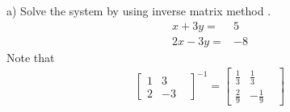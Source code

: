 \documentclass{exam}
\begin{document}
\begin{questions}
	
	\question 	\subitem a) Solve the system by using inverse matrix method .\hfill\enspace\hrulefill
	\begin{align}
	\nonumber
	x+3y=&5 \\ 
	\nonumber
	2x-3y=&-8   
	\end{align}
	Note that 
		\begin{align}
		\nonumber
		\begin{bmatrix}
		1 &   3&  \\
		2 &   -3&  
		\end{bmatrix}^{-1}=
		\begin{bmatrix}
		\frac{1}{3} &   \frac{1}{3}&  \\
		\frac{2}{9} &   -\frac{1}{9}&  
		\end{bmatrix}
		\end{align}
		
		\clearpage
\end{questions}
\clearpage
\end{document}
